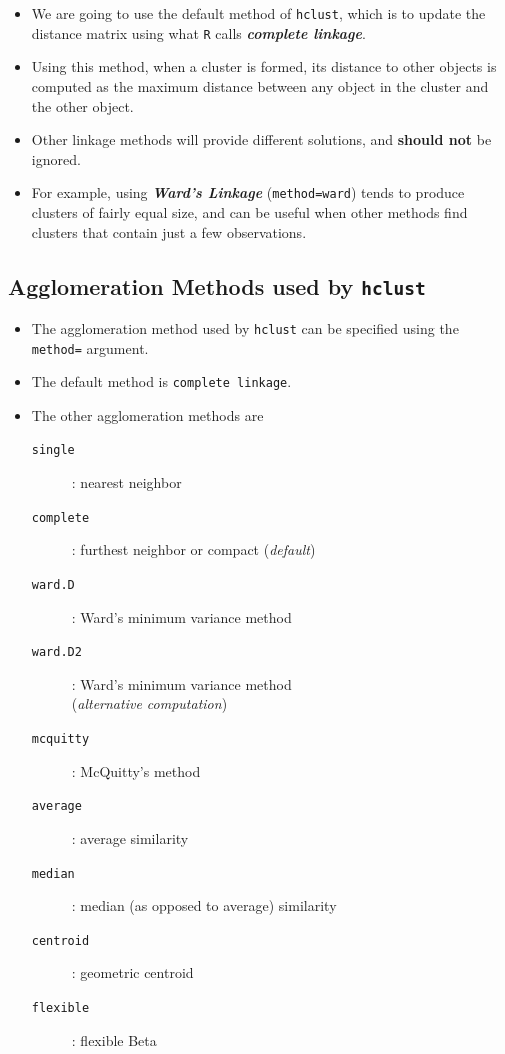 \documentclass[12pt]{article}
\begin{document}
\begin{itemize} 
	\item We are going to use the default method of \texttt{hclust}, which is to update the distance matrix using what \texttt{R} calls \textbf{\textit{complete linkage}}. 
	\item Using this method, when a cluster is formed, its distance to other objects is computed as the maximum distance between any object in the cluster and the other object. 
	\item Other linkage methods will provide different solutions, and \textbf{should not} be ignored. 
	\item For example, using \textbf{\textit{Ward's Linkage}} (\texttt{method=ward}) tends to produce clusters of fairly equal size, and can be useful when other methods find clusters that contain just a few observations.
\end{itemize}
 

\newpage
\subsection{Agglomeration Methods used by \texttt{hclust}}
\begin{itemize}
\item The agglomeration method used by \texttt{hclust} can be specified using the \texttt{method=} argument.
\item The default method is \texttt{complete linkage}.

\item The other agglomeration methods are
\begin{framed}
\begin{description}
\item[\texttt{single }]: nearest neighbor
\item[\texttt{complete }]: furthest neighbor or compact (\textit{default})
\item[\texttt{ward.D }]:  Ward's minimum variance method
\item[\texttt{ward.D2}]:  Ward's minimum variance method \\ (\textit{alternative computation})
\item[\texttt{mcquitty }]: McQuitty's method
\item[\texttt{average }]: average similarity
\item[\texttt{median }]: median (as opposed to average) similarity
\item[\texttt{centroid }]: geometric centroid
\item[\texttt{flexible }]: flexible Beta
\end{description}
\end{framed}
\end{itemize}
\newpage
\end{document}
